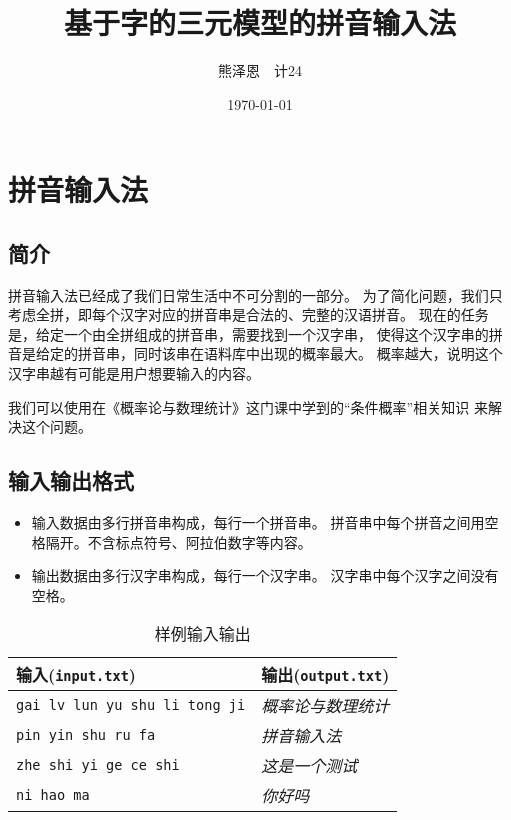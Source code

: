 \documentclass[UTF8]{ctexart}
\title{基于字的三元模型的拼音输入法}
\author{熊泽恩~~计24}
\date{\today}
\begin{document}
\maketitle

\tableofcontents

\newpage

\section{拼音输入法}

\subsection{简介}

拼音输入法已经成了我们日常生活中不可分割的一部分。
为了简化问题，我们只考虑全拼，即每个汉字对应的拼音串是合法的、完整的汉语拼音。
现在的任务是，给定一个由全拼组成的拼音串，需要找到一个汉字串，
使得这个汉字串的拼音是给定的拼音串，同时该串在语料库中出现的概率最大。
概率越大，说明这个汉字串越有可能是用户想要输入的内容。

我们可以使用在《概率论与数理统计》这门课中学到的“条件概率”相关知识
来解决这个问题。

\subsection{输入输出格式}

\begin{itemize}
    \item 输入数据由多行拼音串构成，每行一个拼音串。
            拼音串中每个拼音之间用空格隔开。不含标点符号、阿拉伯数字等内容。
    \item 输出数据由多行汉字串构成，每行一个汉字串。
            汉字串中每个汉字之间没有空格。
\end{itemize}

\begin{table}[H]
    \centering
    \begin{tabular}{||l||l||}
        \hline
        输入(\texttt{input.txt}) & 输出(\texttt{output.txt}) \\
        \hline
        \texttt{gai lv lun yu shu li tong ji} & \em{概率论与数理统计} \qquad\qquad\qquad\qquad \\
        \texttt{pin yin shu ru fa} & \em{拼音输入法} \\
        \texttt{zhe shi yi ge ce shi} & \em{这是一个测试} \\
        \texttt{ni hao ma} & \em{你好吗} \\
        \hline
    \end{tabular}
    \caption{样例输入输出}
\end{table}
\end{document}
